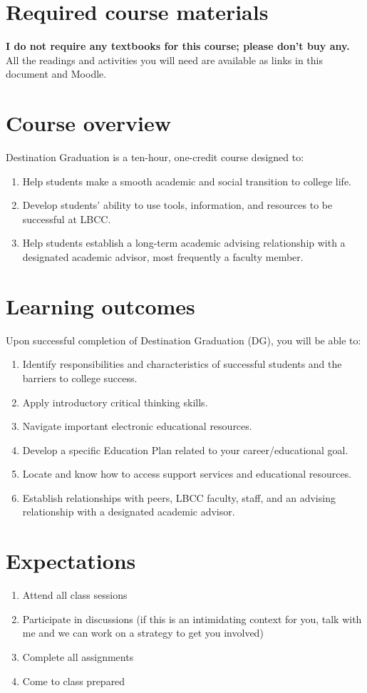 \documentclass[12pt,article,oneside]{memoir}
\begin{document}
\section{Required course materials}
\textbf{I do not require any textbooks for this course; please don't buy any.}  All the readings and activities you will need are available as links in this document and Moodle.

\section{Course overview}
Destination Graduation is a ten-hour, one-credit course designed to:
\begin{enumerate}
 \item Help students make a smooth academic and social transition to college life.
 \item Develop students' ability to use tools, information, and resources to be successful at LBCC.
 \item Help students establish a long-term academic advising relationship with a designated academic advisor, most frequently a faculty member.
\end{enumerate}

\section{Learning outcomes}
Upon successful completion of Destination Graduation (DG), you will be able to:
\begin{enumerate}
 \item Identify responsibilities and characteristics of successful students and the barriers to college success.
 \item Apply introductory critical thinking skills.
 \item Navigate important electronic educational resources.
 \item Develop a specific Education Plan related to your career/educational goal.
 \item Locate and know how to access support services and educational resources.
 \item Establish relationships with peers, LBCC faculty, staff, and an advising relationship with a designated academic advisor.
\end{enumerate}

\section{Expectations}
\begin{enumerate}
 \item Attend all class sessions
 \item Participate in discussions (if this is an intimidating context for you, talk with me and we can work on a strategy to get you involved)
 \item Complete all assignments
 \item Come to class prepared
\end{enumerate}
\end{document}
